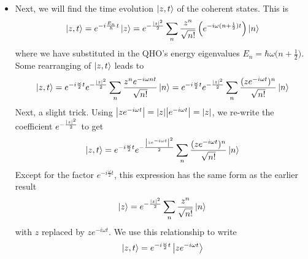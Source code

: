 \documentclass[11pt, a4paper]{article}
\begin{document}
\begin{itemize}
	\item Next, we will find the time evolution $ \ket{z, t} $ of the coherent states. This is
	\begin{equation*}
		\ket{z, t} = e^{-i\frac{E_{n}}{\hbar}t} \ket{z} = e^{-\frac{\abs{z}^{2}}{2}} \sum_{n}\frac{z^{n}}{\sqrt{n!}} \left(e^{-i\omega (n + \frac{1}{2})t}\right) \ket{n} 
	\end{equation*}
	where we have substituted in the QHO's energy eigenvalues $ E_{n} = \hbar\omega \big(n + \frac{1}{2}\big) $. Some rearranging of $ \ket{z, t} $ leads to
	\begin{equation*}
		\ket{z, t} = e^{-i\frac{\omega}{2}t}e^{-\frac{\abs{z}^{2}}{2}}\sum_{n}\frac{z^{n}e^{-i\omega n t}}{\sqrt{n!}}\ket{n} = e^{-i\frac{\omega}{2}t}e^{-\frac{\abs{z}^{2}}{2}} \sum_{n} \frac{(ze^{-i\omega t})^{n}}{\sqrt{n!}} \ket{n}
	\end{equation*}
	Next, a slight trick. Using $ \abs{ze^{-i\omega t}} = \abs{z}\abs{e^{-i\omega t}} = \abs{z}$, we re-write the coefficient $ e^{-\frac{\abs{z}^{2}}{2}} $ to get
	\begin{equation*}
		\ket{z, t} =  e^{-i\frac{\omega}{2}t}e^{-\frac{\abs{ze^{-i\omega t}}^{2}}{2}} \sum_{n} \frac{(ze^{-i\omega t})^{n}}{\sqrt{n!}} \ket{n}
	\end{equation*}
	Except for the factor $ e^{-i\frac{\omega}{2}t} $, this expression has the same form as the earlier result
	\begin{equation*}
		\ket{z} = e^{-\frac{\abs{z}^{2}}{2}} \sum_{n}\frac{z^{n}}{\sqrt{n!}} \ket{n}
	\end{equation*}
	with $ z $ replaced by $ z e^{-i\omega t} $. We use this relationship to write
	\begin{equation*}
		\ket{z, t} = e^{-i \frac{\omega}{2}t} \ket{z e^{-i\omega t}}
	\end{equation*}
	

\end{itemize}
\end{document}
